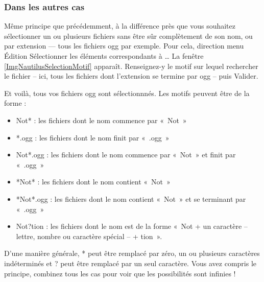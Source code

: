 \subsubsection{Dans les autres cas}
Même principe que précédemment, à la différence près que vous souhaitez sélectionner un ou plusieurs fichiers sans être sûr complètement de son nom, ou par extension --- tous les fichiers ogg par exemple. Pour cela, direction menu Édition \FlecheDroite Sélectionner les éléments correspondants à \ldots{} La fenêtre \ref{ImgNautilusSelectionMotif} apparaît. Renseignez-y le motif sur lequel rechercher le fichier -- ici, tous les fichiers dont l'extension se termine par ogg -- puis Valider.\par
{}
Et voilà, tous vos fichiers ogg sont sélectionnnés. Les motifs peuvent être de la forme :\par
\begin{itemize}
\item Not* : les fichiers dont le nom commence par «~Not~»
\item *.ogg : les fichiers dont le nom finit par «~.ogg~»
\item Not*.ogg : les fichiers dont le nom commence par «~Not~» et finit par «~.ogg~»
\item *Not* : les fichiers dont le nom contient «~Not~»
\item *Not*.ogg : les fichiers dont le nom contient «~Not~» et se terminant par «~.ogg~»
\item Not?tion : les fichiers dont le nom est de la forme «~Not + un caractère -- lettre, nombre ou caractère spécial -- + tion~».
\end{itemize}
D'une manière générale, * peut être remplacé par zéro, un ou plusieurs caractères indéterminés et ? peut être remplacé par un seul caractère. Vous avez compris le principe, combinez tous les cas pour voir que les possibilités sont infinies !

